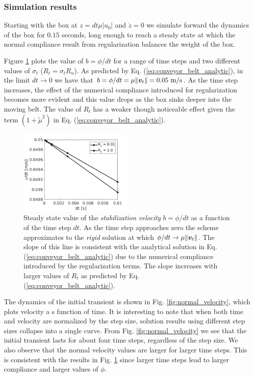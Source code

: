 \subsubsection{Simulation results}

Starting with the box at $z=dt\mu|u_0|$ and $\dot{z}=0$ we simulate forward the
dynamics of the box for $0.15$ seconds, long enough to reach a steady state at
which the normal compliance result from regularization balances the weight of
the box.

Figure \ref{fig:phi_over_h_Rt_comparison} plots the value of $b=\phi/dt$ for a
range of time steps and two different values of $\sigma_t$ ($R_t=\sigma_tR_n$).
As predicted by Eq. (\ref{eq:conveyor_belt_analytic}), in the limit
$dt\rightarrow 0$ we have that
$b=\phi/dt=\mu\Vert{\bm{v}}_t\Vert=0.05~\text{m}/\text{s}$. As the time step
increases, the effect of the numerical compliance introduced for regularization
becomes more evident and this value drops as the box sinks deeper into the
moving belt. The value of $R_t$ has a weaker though noticeable effect given the
term $(1+\tilde\mu^2)$ in Eq. (\ref{eq:conveyor_belt_analytic}).
%
\begin{figure}[!h]
	\centering
	\includegraphics[width=0.5\textwidth]{figures/conveyor_belt/phi_over_h_Rt_comparison.png}
	\caption{\label{fig:phi_over_h_Rt_comparison} 
	Steady state value of the \textit{stabilization velocity} $b=\phi/dt$ as a
	function of the time step $dt$. As the time step approaches zero the scheme
	approximates to the \textit{rigid} solution at which
	$\phi/dt\rightarrow\mu\Vert{\bm{v}}_t\Vert$. The slope of this line is
	consistent with the analytical solution in Eq.
	(\ref{eq:conveyor_belt_analytic}) due to the numerical compliance introduced
	by the regularization terms. The slope increases with larger values of $R_t$
	as predicted by Eq. (\ref{eq:conveyor_belt_analytic}).}
\end{figure}

The dynamics of the initial transient is shown in Fig.
\ref{fig:normal_velocity}, which plots velocity a s function of time. It is
interesting to note that when both time and velocity are normalized by the step
size, solution results using different step sizes collapse into a single curve.
From Fig. \ref{fig:normal_velocity} we see that the initial transient lasts for
about four time steps, regardless of the step size. We also observe that the
normal velocity values are larger for larger time steps. This is consistent with
the results in Fig. \ref{fig:phi_over_h_Rt_comparison} since larger time steps
lead to larger compliance and larger values of $\phi$. 


